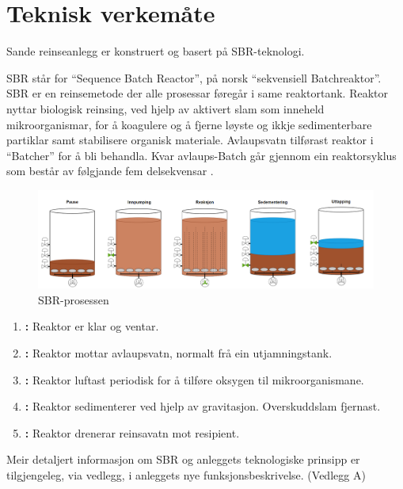 \newpage
\section{Teknisk verkemåte}
\thispagestyle{fancy}
Sande reinseanlegg er konstruert og basert på \gls{SBR}-teknologi.

\gls{SBR} står for ``Sequence \Gls{Batch} Reactor'', på norsk ``sekvensiell \gls{Batch}reaktor''.\newline
\gls{SBR} er en reinsemetode der alle prosessar føregår i same reaktortank. 
Reaktor nyttar biologisk reinsing, ved hjelp av aktivert slam som inneheld mikroorganismar, for å koagulere 
og å fjerne løyste og ikkje sedimenterbare partiklar samt stabilisere organisk materiale. 
Avlaupsvatn tilførast reaktor i ``\gls{Batch}er'' for å bli behandla. 
Kvar avlaups-\gls{Batch} går gjennom ein reaktorsyklus som består av følgjande fem delsekvensar \citep{Statsforvalter}.
\newline

\begin{figure}[htbp]
    \centering
    \includegraphics[width=1\textwidth]{Figurar/SBR-V2.png}
    \caption{\gls{SBR}-prosessen}\label{fig:SBR-Prosessen}
\end{figure}


\begin{enumerate}
    \item \textbf{:} Reaktor er klar og ventar.
    \item \textbf{:} Reaktor mottar avlaupsvatn, normalt frå ein utjamningstank.
    \item \textbf{:} Reaktor luftast periodisk for å tilføre oksygen til mikroorganismane.
    \item \textbf{:} Reaktor sedimenterer ved hjelp av gravitasjon. Overskuddslam fjernast.
    \item \textbf{:} Reaktor drenerar reinsavatn mot resipient.
\end{enumerate}

Meir detaljert informasjon om \gls{SBR} og anleggets teknologiske prinsipp er tilgjengeleg, via vedlegg, i anleggets nye
funksjonsbeskrivelse. (Vedlegg A)

